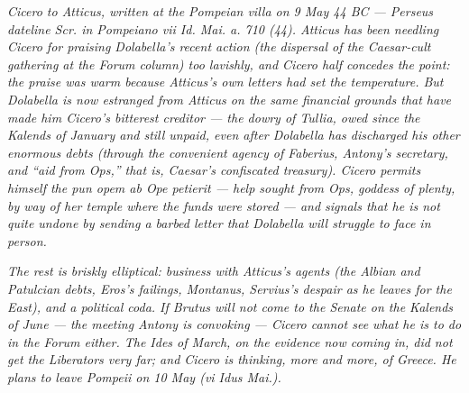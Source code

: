 
\textit{Cicero to Atticus, written at the Pompeian villa on 9 May
44 BC --- Perseus dateline \textit{Scr. in Pompeiano vii Id. Mai.
a. 710 (44)}. Atticus has been needling Cicero for praising
Dolabella's recent action (the dispersal of the Caesar-cult
gathering at the Forum column) too lavishly, and Cicero half
concedes the point: the praise was warm because Atticus's own
letters had set the temperature. But Dolabella is now estranged
from Atticus on the same financial grounds that have made him
Cicero's bitterest creditor --- the dowry of Tullia, owed since
the Kalends of January and still unpaid, even after Dolabella has
discharged his other enormous debts (through the convenient
agency of Faberius, Antony's secretary, and ``aid from Ops,''
that is, Caesar's confiscated treasury). Cicero permits himself
the pun \textit{opem ab Ope petierit} --- help sought from Ops,
goddess of plenty, by way of her temple where the funds were
stored --- and signals that he is not quite undone by sending a
barbed letter that Dolabella will struggle to face in person.}

\textit{The rest is briskly elliptical: business with Atticus's
agents (the Albian and Patulcian debts, Eros's failings,
Montanus, Servius's despair as he leaves for the East), and a
political coda. If Brutus will not come to the Senate on the
Kalends of June --- the meeting Antony is convoking --- Cicero
cannot see what he is to do in the Forum either. The Ides of
March, on the evidence now coming in, did not get the
Liberators very far; and Cicero is thinking, more and more, of
Greece. He plans to leave Pompeii on 10 May (\textit{vi Idus
Mai.}).}
